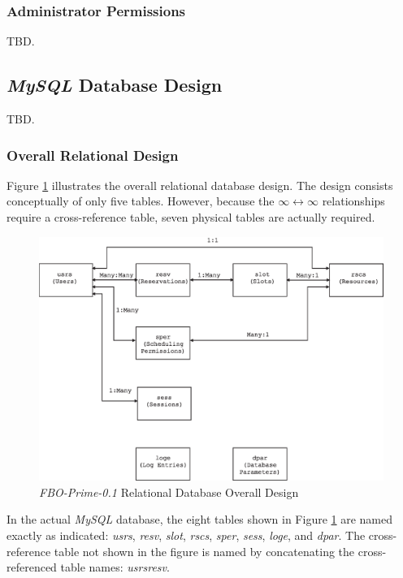 \documentclass[letterpaper,10pt,titlepage]{article}
\newcommand{\productbasename}{FBO-Prime}
\newcommand{\productversion}{0.1}
\newcommand{\productname}{\productbasename{}-\productversion}
\begin{document}
\subsubsection{Administrator Permissions}
\label{stdd0:supm0:sadp0}

TBD.


\subsection{\emph{MySQL} Database Design}
\label{stdd0:smdd0}

TBD.


\subsubsection{Overall Relational Design}
\label{stdd0:srds0}

Figure \ref{fig:stdd0:srds0:00} illustrates the overall relational
database design.  The design consists conceptually of only five tables.
However, because the $\infty\leftrightarrow\infty$ relationships require
a cross-reference table, seven physical tables are actually required.

\begin{figure}
\centering
\includegraphics[width=4.6in]{rdoveralldesign01.eps}
\caption{\emph{\productname{}} Relational Database Overall Design}
\label{fig:stdd0:srds0:00}
\end{figure}

In the actual \emph{MySQL} database, the eight tables shown in 
Figure \ref{fig:stdd0:srds0:00} are named exactly
as indicated:  
\emph{usrs},  
\emph{resv}, 
\emph{slot},
\emph{rscs}, 
\emph{sper}, 
\emph{sess}, 
\emph{loge}, 
and 
\emph{dpar}.
The cross-reference table not shown in the figure is named by concatenating the 
cross-referenced table names:  
\emph{usrsresv}.
\end{document}
